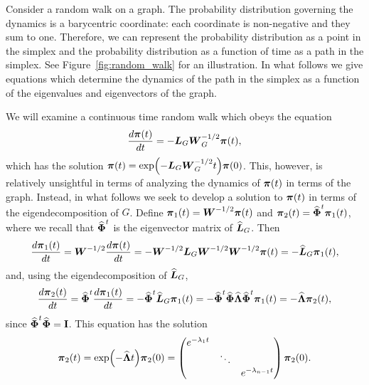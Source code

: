 Consider a  random walk on a graph. The probability distribution  governing the dynamics is a barycentric  coordinate: each coordinate is non-negative and they sum to one. Therefore, we can represent the probability distribution as a point in the simplex and the probability  distribution as a function of time as a path in the simplex. See Figure~\ref{fig:random_walk} for an illustration. In what follows we give equations which determine the dynamics of the path in the simplex as a function of the eigenvalues  and eigenvectors  of the graph. 

We will examine a continuous time random walk which  obeys the equation 
\begin{equation*}
\frac{d \boldsymbol{\pi}(t)}{dt } = -\vb*{L}_G\vb*{W}_G^{-1/2} \boldsymbol{\pi}(t),
\end{equation*}
which has the solution $\boldsymbol{\pi}(t)  = \exp(-\vb*{L}_G\vb*{W}_G^{-1/2}t)\boldsymbol{\pi}(0)$. This, however, is relatively unsightful in terms of  analyzing the dynamics of $\boldsymbol{\pi}(t)$ in terms of the  graph.  Instead, in  what follows we seek  to develop a solution to $\boldsymbol{\pi}(t)$ in terms of the  eigendecomposition of  $G$.  Define $\boldsymbol{\pi}_1(t) = \vb*{W}^{-1/2}\boldsymbol{\pi}(t)$ and $\boldsymbol{\pi}_2(t) = \widehat{\boldsymbol{\Phi}}^t \boldsymbol{\pi}_1(t)$, where we recall that $\widehat{\boldsymbol{\Phi}}^t$ is the eigenvector matrix  of  $\widehat{\vb*{L}}_G$.  Then 
\begin{equation*}
\frac{d \boldsymbol{\pi}_1(t)}{dt} = \vb*{W}^{-1/2}\frac{d \boldsymbol{\pi}(t)}{dt} = -\vb*{W}^{-1/2}\vb*{L}_G\vb*{W}^{-1/2}\vb*{W}^{-1/2}\boldsymbol{\pi}(t) = - \widehat{\vb*{L}}_G\boldsymbol{\pi}_1(t),
\end{equation*}
and, using the eigendecomposition of $\widehat{\vb*{L}}_G$,   
\begin{equation*}
\frac{ d\boldsymbol{\pi}_2(t)}{dt} = \widehat{\boldsymbol{\Phi}}^t \frac{d\boldsymbol{\pi}_1(t)}{dt} = -\widehat{\boldsymbol{\Phi}}^t \widehat{\vb*{L}}_G \boldsymbol{\pi}_1(t) = -\widehat{\boldsymbol{\Phi}}^t \widehat{\boldsymbol{\Phi}}\widehat{\vb{\Lambda}}\widehat{\boldsymbol{\Phi}}^t \boldsymbol{\pi}_1(t) = -\widehat{\vb{\Lambda}}  \boldsymbol{\pi}_2(t),
\end{equation*}
since  $\widehat{\boldsymbol{\Phi}}^t\widehat{\boldsymbol{\Phi}}=\vb{I}$. This equation  has the solution 
\begin{equation*}
\boldsymbol{\pi}_2(t) = \exp(-\widehat{\vb{\Lambda}} t)\boldsymbol{\pi}_2(0) = \begin{pmatrix}
e^{-\lambda_1 t}  & &\\
& \ddots  & \\
&& e^{-\lambda_{n-1} t}
\end{pmatrix}  \boldsymbol{\pi}_2(0).
\end{equation*}

